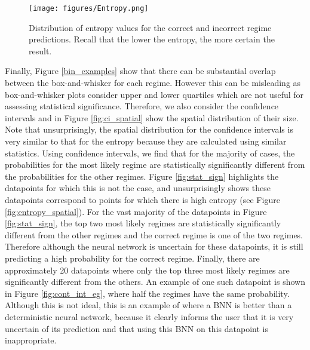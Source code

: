 \documentclass[a4paper]{article}
\begin{document}
\begin{figure}
    \centering
    \texttt{[image: figures/Entropy.png]}
    \caption{Distribution of entropy values for the correct and incorrect regime predictions. Recall that the lower the entropy, the more certain the result.}
    \label{fig:entropy}
\end{figure}

Finally, Figure \ref{bin_examples} show that there can be substantial overlap between the box-and-whisker for each regime. However this can be misleading as box-and-whisker plots consider upper and lower quartiles which are not useful for assessing statistical significance. Therefore, we also consider the confidence intervals and in Figure \ref{fig:ci_spatial} show the spatial distribution of their size. Note that unsurprisingly, the spatial distribution for the confidence intervals is very similar to that for the entropy because they are calculated using similar statistics. Using confidence intervals, we find that for the majority of cases, the probabilities for the most likely regime are statistically significantly different from the probabilities for the other regimes. Figure \ref{fig:stat_sign} highlights the datapoints for which this is not the case, and unsurprisingly shows these datapoints correspond to points for which there is high entropy (see Figure \ref{fig:entropy_spatial}). For the vast majority of the datapoints in Figure \ref{fig:stat_sign}, the top two most likely regimes are statistically significantly different from the other regimes and the correct regime is one of the two regimes. Therefore although the neural network is uncertain for these datapoints, it is still predicting a high probability for the correct regime. Finally, there are approximately 20 datapoints where only the top three most likely regimes are significantly different from the others. An example of one such datapoint is shown in Figure \ref{fig:cont_int_eg}, where half the regimes have the same probability. Although this is not ideal, this is an example of where a BNN is better than a deterministic neural network, because it clearly informs the user that it is very uncertain of its prediction and that using this BNN on this datapoint is inappropriate.
\end{document}
